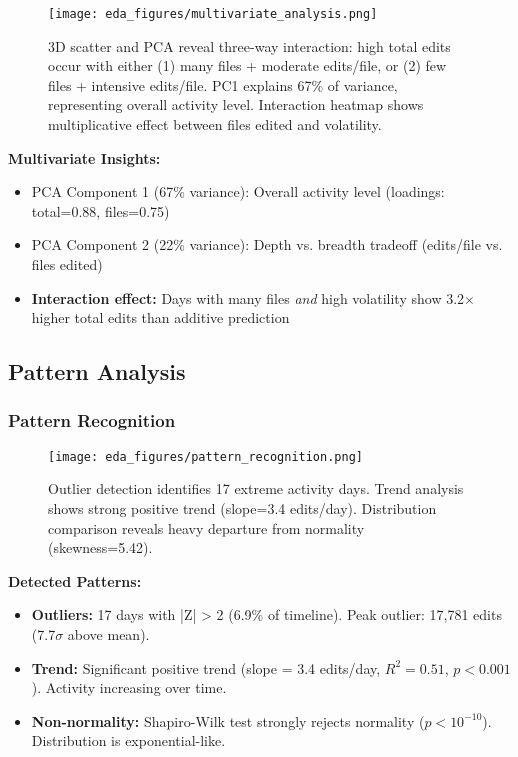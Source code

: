 \documentclass[11pt]{article}
\begin{document}
\begin{figure}[H]
\centering
\texttt{[image: eda\_figures/multivariate\_analysis.png]}
\caption{3D scatter and PCA reveal three-way interaction: high total edits occur with either (1) many files + moderate edits/file, or (2) few files + intensive edits/file. PC1 explains 67\% of variance, representing overall activity level. Interaction heatmap shows multiplicative effect between files edited and volatility.}
\end{figure}

\textbf{Multivariate Insights:}
\begin{itemize}
    \item PCA Component 1 (67\% variance): Overall activity level (loadings: total=0.88, files=0.75)
    \item PCA Component 2 (22\% variance): Depth vs. breadth tradeoff (edits/file vs. files edited)
    \item \textbf{Interaction effect:} Days with many files \textit{and} high volatility show 3.2$\times$ higher total edits than additive prediction
\end{itemize}

\subsection{Pattern Analysis}

\subsubsection{Pattern Recognition}

\begin{figure}[H]
\centering
\texttt{[image: eda\_figures/pattern\_recognition.png]}
\caption{Outlier detection identifies 17 extreme activity days. Trend analysis shows strong positive trend (slope=3.4 edits/day). Distribution comparison reveals heavy departure from normality (skewness=5.42).}
\end{figure}

\textbf{Detected Patterns:}
\begin{itemize}
    \item \textbf{Outliers:} 17 days with |Z| > 2 (6.9\% of timeline). Peak outlier: 17,781 edits (7.7$\sigma$ above mean).
    \item \textbf{Trend:} Significant positive trend (slope = 3.4 edits/day, $R^2 = 0.51$, $p < 0.001$). Activity increasing over time.
    \item \textbf{Non-normality:} Shapiro-Wilk test strongly rejects normality ($p < 10^{-10}$). Distribution is exponential-like.
\end{itemize}
\end{document}
